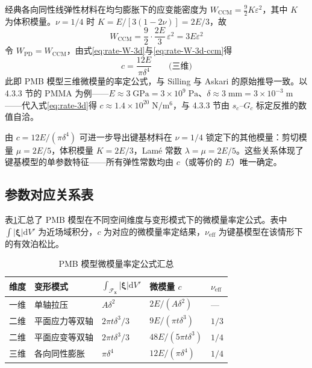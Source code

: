 经典各向同性线弹性材料在均匀膨胀下的应变能密度为 $W_{\mathrm{CCM}}=\tfrac{9}{2}K\varepsilon^{2}$，其中 $K$ 为体积模量。$\nu=1/4$ 时 $K=E/[3(1-2\nu)]=2E/3$，故
\begin{equation}
W_{\mathrm{CCM}} = \frac{9}{2}\cdot\frac{2E}{3}\,\varepsilon^{2} = 3E\varepsilon^{2}
\label{eq:rate-W-3d-ccm}
\end{equation}
令 $W_{\mathrm{PD}}=W_{\mathrm{CCM}}$，由式\eqref{eq:rate-W-3d}与\eqref{eq:rate-W-3d-ccm}得
\begin{equation}
c = \frac{12E}{\pi\delta^{4}} \qquad \text{(三维)}
\label{eq:rate-3d}
\end{equation}
此即 PMB 模型三维微模量的率定公式，与 Silling 与 Askari \cite{SillingAskari2005} 的原始推导一致。以 4.3.3 节的 PMMA 为例——$E\approx 3\;\mathrm{GPa}=3\times 10^{9}\;\mathrm{Pa}$、$\delta\approx 3\;\mathrm{mm}=3\times 10^{-3}\;\mathrm{m}$——代入式\eqref{eq:rate-3d}得 $c\approx 1.4\times 10^{20}\;\mathrm{N}/\mathrm{m}^{6}$，与 4.3.3 节由 $s_c$--$G_c$ 标定反推的数值自洽。

由 $c=12E/(\pi\delta^{4})$ 可进一步导出键基材料在 $\nu=1/4$ 锁定下的其他模量：剪切模量 $\mu=2E/5$，体积模量 $K=2E/3$，Lam\'e 常数 $\lambda=\mu=2E/5$。这些关系体现了键基模型的单参数特征——所有弹性常数均由 $c$（或等价的 $E$）唯一确定。

\subsection{参数对应关系表}

表\ref{tab:rate-summary}汇总了 PMB 模型在不同空间维度与变形模式下的微模量率定公式。表中 $\int|\boldsymbol{\xi}|\mathrm{d}V'$ 为近场域积分，$c$ 为对应的微模量率定结果，$\nu_{\mathrm{eff}}$ 为键基模型在该情形下的有效泊松比。

\begin{table}[htbp]
\centering
\small
\caption{PMB 模型微模量率定公式汇总\cite{SillingAskari2005}}
\label{tab:rate-summary}
\begin{tabular}{>{\raggedright\arraybackslash}p{}>{\raggedright\arraybackslash}p{}>{\raggedright\arraybackslash}p{}>{\raggedright\arraybackslash}p{}>{\raggedright\arraybackslash}p{}}
\toprule
维度 & 变形模式 & $\int_{\mathcal{F}_{\mathbf{x}}}|\boldsymbol{\xi}|\mathrm{d}V'$ & 微模量 $c$ & $\nu_{\mathrm{eff}}$ \\
\midrule
一维 & 单轴拉压 & $A\delta^{2}$ & $2E/(A\delta^{2})$ & --- \\
二维 & 平面应力等双轴 & $2\pi t\delta^{3}/3$ & $9E/(\pi t\delta^{3})$ & $1/3$ \\
二维 & 平面应变等双轴 & $2\pi t\delta^{3}/3$ & $48E/(5\pi t\delta^{3})$ & $1/4$ \\
三维 & 各向同性膨胀 & $\pi\delta^{4}$ & $12E/(\pi\delta^{4})$ & $1/4$ \\
\bottomrule
\end{tabular}
\end{table}

